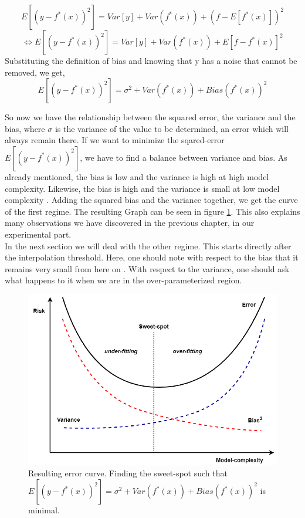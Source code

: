\[ E[(y - f^*(x))^2] = Var[y] + Var(f^*(x)) + (f - E[f^*(x)])^2 \] 
\[\Longleftrightarrow E[(y - f^*(x))^2] = Var[y] + Var(f^*(x)) +  E[f -f^*(x)]^2 \]
Substituting the definition of bias and knowing that y has a noise that cannot be removed, we get,
\begin{equation}
    E[(y - f^*(x))^2] =\sigma^2 + Var(f^*(x)) + Bias(f^*(x))^2
    \label{bias_variance_eq}
\end{equation}


So now we have the relationship between the squared error, the variance and the bias, where $ \sigma$ is the variance of the value to be determined, an error which will always remain there. If we want to minimize the sqared-error $E[(y - f^*(x))^2]$, we have to find a balance between variance and bias. 
As already mentioned, the bias is low and the variance is high at high model complexity. Likewise, the bias is high and the variance is small at low model complexity \cite{wikipedia_bias_variance}. Adding the squared bias and the variance together, we get the curve of the first regime. The resulting Graph can be seen in figure \ref{fig:bv_decomposition}. This also explains many observations we have discovered in the previous chapter, in our experimental part.  \\
In the next section we will deal with the other regime. This starts directly after the interpolation threshold. Here, one should note with respect to the bias that it remains very small from here on \cite{pmlr-v119-d-ascoli20a}. With respect to the variance, one should ask what happens to it when we are in the over-parameterized region.


\begin{figure}[!htp]
\centering
\includegraphics[scale=0.35]{Abschlussarbeit_2021/LaTeX/images/integral_bias_variance.drawio.png}
\caption{Resulting error curve. Finding the sweet-spot such that\\
$E[(y - f^*(x))^2]  = \sigma^2 + Var(f^*(x)) + Bias(f^*(x))^2$ is minimal.}
\label{fig:bv_decomposition}
\end{figure}

